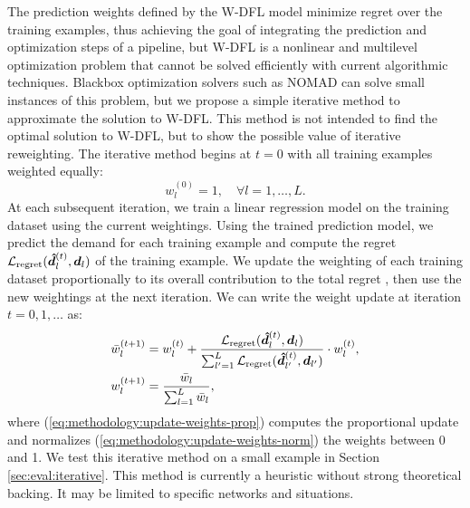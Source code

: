 The prediction weights defined by the W-DFL model minimize regret over the training examples, thus achieving the goal of integrating the prediction and optimization steps of a pipeline, but W-DFL is a nonlinear and multilevel optimization problem that cannot be solved efficiently with current algorithmic techniques. Blackbox optimization solvers such as NOMAD \citep{nomad4paper} can solve small instances of this problem, but we propose a simple iterative method to approximate the solution to W-DFL. This method is not intended to find the optimal solution to W-DFL, but to show the possible value of iterative reweighting. The iterative method begins at $t=0$ with all training examples weighted equally:\begin{equation}
    w_l^{(0)} = 1, \quad\forall l=1,\ldots, L.
\end{equation}
At each subsequent iteration, we train a linear regression model on the training dataset using the current weightings. Using the trained prediction model, we predict the demand for each training example and compute the regret $\mathcal{L}_{\text{regret}}({\bm{\hat{d}}}_l^{(t)}, {\bm{d}}_l)$ of the training example. We update the weighting of each training dataset proportionally to its overall contribution to the total regret , then use the new weightings at the next iteration.
We can write the weight update at iteration $t = 0, 1, \dots$ as:
\begin{align}
    \bar{w}_l^{(t+1)} &= w_l^{(t)} + \dfrac{\mathcal{L}_{\text{regret}}({\bm{\hat{d}}}_l^{(t)}, {\bm{d}}_l)}{\sum_{l'=1}^L  \mathcal{L}_{\text{regret}}({\bm{\hat{d}}}_{l'}^{(t)}, {\bm{d}}_{l'})} \cdot w_l^{(t)},\label{eq:methodology:update-weights-prop}\\
    w_l^{(t+1)} &= \dfrac{\bar{w}_l}{\sum_{l=1}^L \bar{w}_l},\label{eq:methodology:update-weights-norm}
\end{align}
where (\ref{eq:methodology:update-weights-prop}) computes the proportional update and normalizes (\ref{eq:methodology:update-weights-norm}) the weights between 0 and 1.
We test this iterative method on a small example in Section \ref{sec:eval:iterative}. This method is currently a heuristic without strong theoretical backing. It may be limited to specific networks and situations. 


